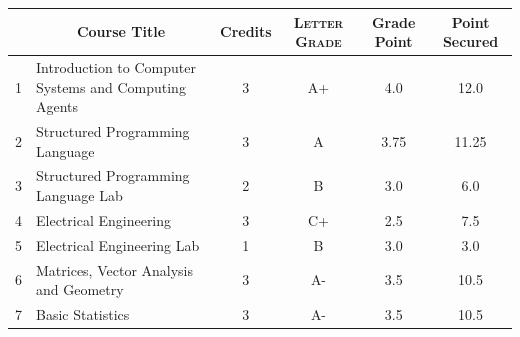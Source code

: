 \documentclass[11pt]{article}
\newcommand*{\numtwo}[1]{\pgfmathprintnumber[
                    fixed, precision=2, fixed zerofill=true]{#1}}
\begin{document}
                \begin{center}
                    \renewcommand{\arraystretch}{1.08}
                    
                \begin{tabular}{|c|l|c|>{\scshape}c|c|c|}
                \hline  \rule[-1ex]{0pt}{3.5ex} {\centering{\bf Course Code}} &  \multicolumn{1}{c|}{\textbf{Course Title}}  & {\bf Credits} & {\bf Letter Grade} & {\bf Grade Point} & {\bf Point Secured}  \\ 
                \hline   1 &  Introduction to Computer Systems and Computing Agents		 & 3 & A+ & 4.0 & 12.0 \\ %
                \hline   2 &  Structured Programming Language		 & 3 & A & 3.75 & 11.25 \\ %
                \hline   3 &  Structured Programming Language Lab		 & 2 & B & 3.0 & 6.0 \\ %
                \hline   4 &  Electrical Engineering		 & 3 & C+ & 2.5 & 7.5 \\ %
                \hline   5 &  Electrical Engineering Lab		 & 1 & B & 3.0 & 3.0 \\ %
                \hline   6 &  Matrices, Vector Analysis and Geometry		 & 3 & A- & 3.5 & 10.5 \\ %
                \hline   7 &  Basic Statistics		 & 3 & A- & 3.5 & 10.5 \\ %

\hline                %
                \end{tabular}
                \end{center}
                \renewcommand{\arraystretch}{1.03}
\end{document}

